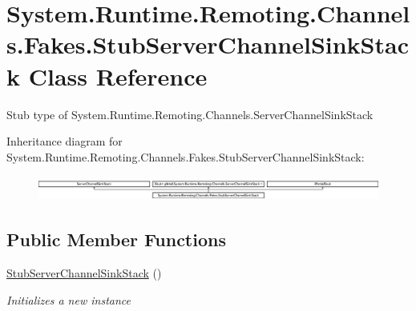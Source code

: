 \hypertarget{class_system_1_1_runtime_1_1_remoting_1_1_channels_1_1_fakes_1_1_stub_server_channel_sink_stack}{\section{System.\-Runtime.\-Remoting.\-Channels.\-Fakes.\-Stub\-Server\-Channel\-Sink\-Stack Class Reference}
\label{class_system_1_1_runtime_1_1_remoting_1_1_channels_1_1_fakes_1_1_stub_server_channel_sink_stack}
}


Stub type of System.\-Runtime.\-Remoting.\-Channels.\-Server\-Channel\-Sink\-Stack 


Inheritance diagram for System.\-Runtime.\-Remoting.\-Channels.\-Fakes.\-Stub\-Server\-Channel\-Sink\-Stack\-:\begin{figure}[H]
\begin{center}
\leavevmode
\includegraphics[height=0.820513cm]{class_system_1_1_runtime_1_1_remoting_1_1_channels_1_1_fakes_1_1_stub_server_channel_sink_stack}
\end{center}
\end{figure}
\subsection*{Public Member Functions}
\begin{DoxyCompactItemize}
\item 
\hyperlink{class_system_1_1_runtime_1_1_remoting_1_1_channels_1_1_fakes_1_1_stub_server_channel_sink_stack_a1da89f4949480c846aeeebeb5bfe252f}{Stub\-Server\-Channel\-Sink\-Stack} ()
\begin{DoxyCompactList}\small\item\em Initializes a new instance\end{DoxyCompactList}\end{DoxyCompactItemize}
